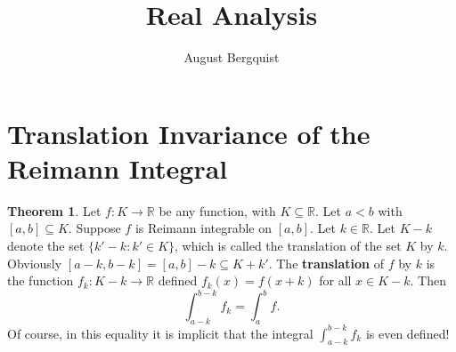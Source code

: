 \documentclass[12pt, letterpaper]{article}
\title{Real Analysis}
\author{August Bergquist}
\newcommand{\R}{\mathbb{R}}
\theoremstyle{definition}
\newtheorem{theorem}{Theorem}
\begin{document}
    \maketitle

    \section{Translation Invariance of the Reimann Integral}

    \begin{theorem}
        Let $f:K\to \R$ be any function, with $K\subseteq \R$. Let $a < b$ with $[a,b]\subseteq K$. Suppose $f$ is Reimann integrable on $[a,b]$. Let $k\in \R$. Let $K - k$ denote the set $ \{k' - k : k'\in K\}$, which is called the translation of the set $K$ by $k$. Obviously $ [a - k, b- k] = [a,b] - k \subseteq K + k' $. The \textbf{translation} of $f$ by $k$ is the function $ f_k:K-k \to \R $ defined $f_k(x) = f(x + k)$ for all $x\in K - k$. Then
        \[
            \int_{a - k}^{b - k} f_k = \int_{a}^{b} f. 
            \]
        Of course, in this equality it is implicit that the integral $\int_{a - k}^{b - k} f_k$ is even defined!
    \end{theorem}
\end{document}
